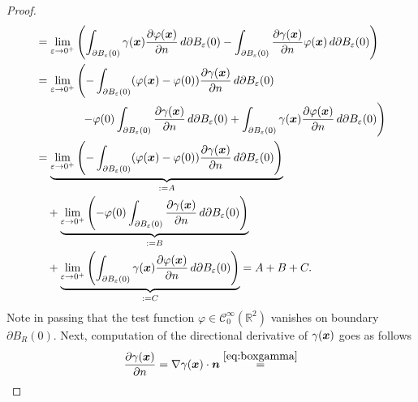 \documentclass[12pt]{article}
\begin{document}
\begin{proof}
\begin{align}
		 & = \lim_{\varepsilon\to 0^+}
		\left(
		\int_{\partial B_{\varepsilon}(0)} \gamma({\boldsymbol{\mathnormal x}})
		\frac{\partial\varphi({\boldsymbol{\mathnormal x}})}{\partial n} \, d\partial B_{\varepsilon}(0)
		- \int_{\partial B_{\varepsilon}(0)}
		\frac{\partial\gamma({\boldsymbol{\mathnormal x}})}{\partial n} \varphi({\boldsymbol{\mathnormal x}}) \, d\partial B_{\varepsilon}(0)
		\right)                                                                              \notag \\
		 & = \lim_{\varepsilon\to 0^+}
		\left(
		-
		\int_{\partial B_\varepsilon(0)} (\varphi({\boldsymbol{\mathnormal x}})-\varphi(0))
		\frac{\partial\gamma({\boldsymbol{\mathnormal x}})}{\partial n}\, d\partial B_{\varepsilon}(0) \right.        \notag \\
		 & \quad\quad\quad\quad
		\left.
		-\varphi(0)\int_{\partial B_\varepsilon(0)}
		\frac{\partial\gamma({\boldsymbol{\mathnormal x}})}{\partial n}\, d\partial B_{\varepsilon}(0)
		+\int_{\partial B_\varepsilon(0)} \gamma({\boldsymbol{\mathnormal x}})
		\frac{\partial\varphi({\boldsymbol{\mathnormal x}})}{\partial n}\, d\partial B_{\varepsilon}(0)
		\right)                                                                              \notag \\
		 & = \underbrace{\lim_{\varepsilon\to 0^+}
			\left(
			-
			\int_{\partial B_\varepsilon(0)} (\varphi({\boldsymbol{\mathnormal x}})-\varphi(0))
			\frac{\partial\gamma({\boldsymbol{\mathnormal x}})}{\partial n}\, d\partial B_{\varepsilon}(0) \right)}_{:=A} \notag \\
		 & \quad + 
		\underbrace{\lim_{\varepsilon\to 0^+}
			\left(
			-\varphi(0)\int_{\partial B_\varepsilon(0)}
			\frac{\partial\gamma({\boldsymbol{\mathnormal x}})}{\partial n}\, d\partial B_{\varepsilon}(0) \right)}_{:=B} \notag \\
		 & \quad + 
		\underbrace{\lim_{\varepsilon\to 0^+}
			\left(
			\int_{\partial B_\varepsilon(0)} \gamma({\boldsymbol{\mathnormal x}})
			\frac{\partial\varphi({\boldsymbol{\mathnormal x}})}{\partial n}\, d\partial B_{\varepsilon}(0)
			\right)}_{:=C} = A+B+C.
	\end{align}
	Note in passing that the test function 
	$\varphi \in \mathcal{C}^{\infty}_{0}(\mathbb{R}^2)$ vanishes on boundary $\partial B_R(0)$.
	Next, computation of the directional derivative of $\gamma({\boldsymbol{\mathnormal x}})$ goes as follows
	\begin{align}
		\frac{\partial\gamma(\Bx)}{\partial n}
		= \nabla \gamma(\Bx) \cdot \Bn 
		\stackrel{\eqref{eq:boxgamma}}{=}

\end{align}
\end{proof}
\end{document}
